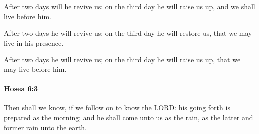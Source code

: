			\begin{versebox}
					\item[BHS] 
					\item[LXX] 
					\item[ASV] After two days will he revive us: on the third day he will raise us up, and we shall live before him.
					\item[NIV] After two days he will revive us; on the third day he will restore us, that we may live in his presence.
					\item[NRSV] After two days he will revive us; on the third day he will raise us up, that we may live before him.
			\end{versebox}

		\paragraph{Hosea 6:3} %
			\label{HOSEA-6-3}

			Then shall we know, if we follow on to know the LORD: his going forth is prepared as the morning; and he shall come unto us as the rain, as the latter and former rain unto the earth.

